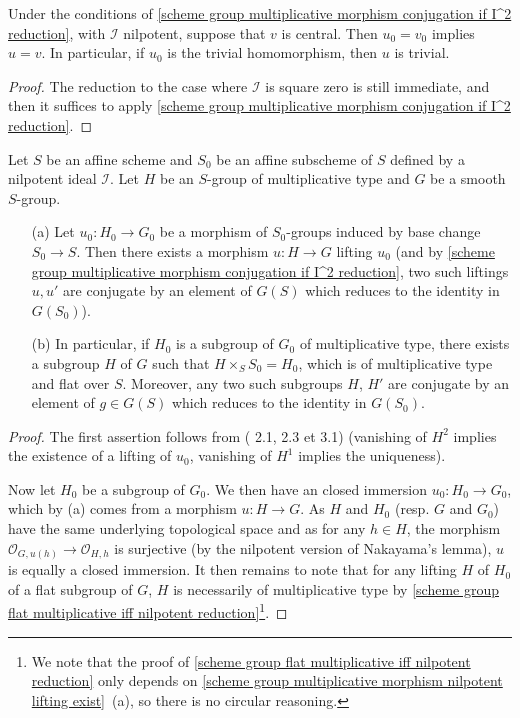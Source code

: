 \begin{corollary}\label{scheme group multiplicative morphism equal if nilpotent reduction}
Under the conditions of \cref{scheme group multiplicative morphism conjugation if I^2 reduction}, with $\mathscr{I}$ nilpotent, suppose that $v$ is central. Then $u_0=v_0$ implies $u=v$. In particular, if $u_0$ is the trivial homomorphism, then $u$ is trivial.
\end{corollary}
\begin{proof}
The reduction to the case where $\mathscr{I}$ is square zero is still immediate, and then it suffices to apply \cref{scheme group multiplicative morphism conjugation if I^2 reduction}.
\end{proof}

\begin{theorem}\label{scheme group multiplicative morphism nilpotent lifting exist}
Let $S$ be an affine scheme and $S_0$ be an affine subscheme of $S$ defined by a nilpotent ideal $\mathscr{I}$. Let $H$ be an $S$-group of multiplicative type and $G$ be a smooth $S$-group.
\begin{enumerate}
    \item[(a)] Let $u_0:H_0\to G_0$ be a morphism of $S_0$-groups induced by base change $S_0\to S$. Then there exists a morphism $u:H\to G$ lifting $u_0$ (and by \cref{scheme group multiplicative morphism conjugation if I^2 reduction}, two such liftings $u,u'$ are conjugate by an element of $G(S)$ which reduces to the identity in $G(S_0)$).
    \item[(b)] In particular, if $H_0$ is a subgroup of $G_0$ of multiplicative type, there exists a subgroup $H$ of $G$ such that $H\times_SS_0=H_0$, which is of multiplicative type and flat over $S$. Moreover, any two such subgroups $H$, $H'$ are conjugate by an element of $g\in G(S)$ which reduces to the identity in $G(S_0)$.
\end{enumerate}
\end{theorem}
\begin{proof}
The first assertion follows from (\cite{SGA3-1}  2.1, 2.3 et 3.1) (vanishing of $H^2$ implies the existence of a lifting of $u_0$, vanishing of $H^1$ implies the uniqueness).\par
Now let $H_0$ be a subgroup of $G_0$. We then have an closed immersion $u_0:H_0\to G_0$, which by (a) comes from a morphism $u:H\to G$. As $H$ and $H_0$ (resp. $G$ and $G_0$) have the same underlying topological space and as for any $h\in H$, the morphism $\mathscr{O}_{G,u(h)}\to\mathscr{O}_{H,h}$ is surjective (by the nilpotent version of Nakayama's lemma), $u$ is equally a closed immersion. It then remains to note that for any lifting $H$ of $H_0$ of a flat subgroup of $G$, $H$ is necessarily of multiplicative type by \cref{scheme group flat multiplicative iff nilpotent reduction}\footnote{We note that the proof of \cref{scheme group flat multiplicative iff nilpotent reduction} only depends on \cref{scheme group multiplicative morphism nilpotent lifting exist}~(a), so there is no circular reasoning.}.
\end{proof}

